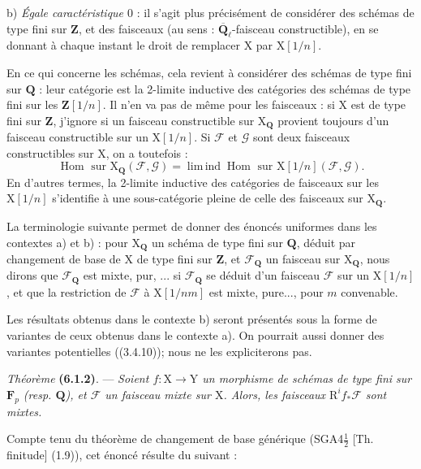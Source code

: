 \documentclass[11pt,leqno]{article}
\begin{document}
b) \textit{Égale caractéristique \(0\)} : il s’agit plus précisément
de considérer des schémas de type fini sur \(\mathbf{Z}\), et des
faisceaux (au sens : \(\overline{\mathbf{Q}}_\ell\)-faisceau
constructible), en se donnant à chaque instant le droit de remplacer
\(\mathrm{X}\) par \(\mathrm{X}[1/n]\).

En ce qui concerne les schémas, cela revient à considérer des schémas
de type fini sur \(\mathbf{Q}\) : leur catégorie est la 2-limite
inductive des catégories des schémas de type fini sur les
\(\mathbf{Z}[1/n]\). Il n’en va pas de même pour les faisceaux :
si \(\mathrm{X}\) est de type fini sur \(\mathbf{Z}\), j’ignore si un
faisceau constructible sur \(\mathrm{X}_{\mathbf{Q}}\) provient toujours
d’un faisceau constructible sur un \(\mathrm{X}[1/n]\). Si
\(\mathscr{F}\) et \(\mathscr{G}\) sont deux faisceaux constructibles
sur \(\mathrm{X}\), on a toutefois :
\[
\operatorname{Hom}\text{ sur }\mathrm{X}_{\mathbf{Q}}(\mathscr{F},\mathscr{G})
=\operatorname{lim\,ind}\operatorname{Hom}\text{ sur }
\mathrm{X}[1/n](\mathscr{F},\mathscr{G}).
\]
En d’autres termes, la 2-limite inductive des catégories de faisceaux
sur les \(\mathrm{X}[1/n]\) s’identifie à une sous-catégorie pleine
de celle des faisceaux sur \(\mathrm{X}_{\mathbf{Q}}\).

La terminologie suivante permet de donner des énoncés uniformes dans
les contextes a) et b) : pour \(\mathrm{X}_{\mathbf{Q}}\) un schéma
de type fini sur \(\mathbf{Q}\), déduit par changement de base de
\(\mathrm{X}\) de type fini sur \(\mathbf{Z}\), et
\(\mathscr{F}_{\mathbf{Q}}\) un faisceau sur \(\mathrm{X}_{\mathbf{Q}}\),
nous dirons que \(\mathscr{F}_{\mathbf{Q}}\) est mixte, pur, ... si
\(\mathscr{F}_{\mathbf{Q}}\) se déduit d’un faisceau \(\mathscr{F}\)
sur un \(\mathrm{X}[1/n]\), et que la restriction de \(\mathscr{F}\)
à \(\mathrm{X}[1/nm]\) est mixte, pure..., pour \(m\) convenable.

Les résultats obtenus dans le contexte b) seront présentés sous la
forme de variantes de ceux obtenus dans le contexte a). On pourrait
aussi donner des variantes potentielles ((3.4.10)); nous ne les
expliciterons pas.

\textit{Théorème} \textbf{(6.1.2)}. — \textit{Soient
\(f:\mathrm{X}\to\mathrm{Y}\) un morphisme de schémas de type fini
sur \(\mathbf{F}_p\) (resp. \(\mathbf{Q}\)), et \(\mathscr{F}\) un
faisceau mixte sur \(\mathrm{X}\). Alors, les faisceaux
\(\mathrm{R}^if_*\mathscr{F}\) sont mixtes.}

Compte tenu du théorème de changement de base générique
(SGA4\(\frac{1}{2}\) [Th. finitude] (1.9)), cet énoncé résulte du
suivant :
\end{document}

